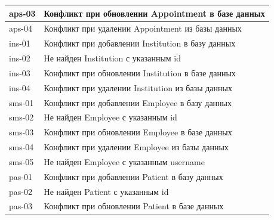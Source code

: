 \documentclass[a4paper,article]{article}
\begin{document}
\begin{sloppypar}
\begin{appendices}
\begin{xltabular}{\textwidth} { |
                >{\hsize} X |
                >{\hsize} X | }
            \hline
            aps-03
            & Конфликт при обновлении Appointment в базе данных \\
            
            \hline
            aps-04
            & Конфликт при удалении Appointment из базы данных \\
            
            \hline
            ins-01
            & Конфликт при добавлении Institution в базу данных \\
            
            \hline
            ins-02
            & Не найден Institution с указанным id \\
            
            \hline
            ins-03
            & Конфликт при обновлении Institution в базе данных \\
            
            \hline
            ins-04
            & Конфликт при удалении Institution из базы данных \\
            
            \hline
            sms-01
            & Конфликт при добавлении Employee в базу данных \\
            
            \hline
            sms-02
            & Не найден Employee с указанным id \\
            
            \hline
            sms-03
            & Конфликт при обновлении Employee в базе данных \\
            
            \hline
            sms-04
            & Конфликт при удалении Employee из базы данных \\
            
            \hline
            sms-05
            & Не найден Employee с указанным username \\
            
            \hline
            pas-01
            & Конфликт при добавлении Patient в базу данных \\
            
            \hline
            pas-02
            & Не найден Patient с указанным id \\
            
            \hline
            pas-03
            & Конфликт при обновлении Patient в базе данных \\
            

\end{xltabular}
\end{appendices}
\end{sloppypar}
\end{document}
